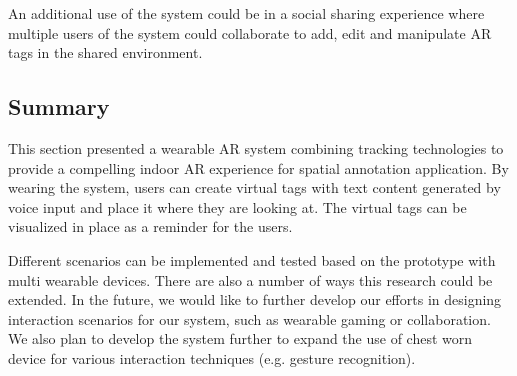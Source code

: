 An additional use of the system could be in a social sharing experience where multiple users of the system could collaborate to add, edit and manipulate AR tags in the shared environment. 
%
%

\subsection{Summary}

This section presented a wearable AR system combining tracking technologies to provide a compelling indoor AR experience for spatial annotation application. By wearing the system, users can create virtual tags with text content generated by voice input and place it where they are looking at. The virtual tags can be visualized in place as a reminder for the users.  

Different scenarios can be implemented and tested based on the prototype with multi wearable devices. There are also a number of ways this research could be extended. In the future, we would like to further develop our efforts in designing interaction scenarios for our system, such as wearable gaming or collaboration. We also plan to develop the system further to expand the use of chest worn device for various interaction techniques (e.g. gesture recognition).
